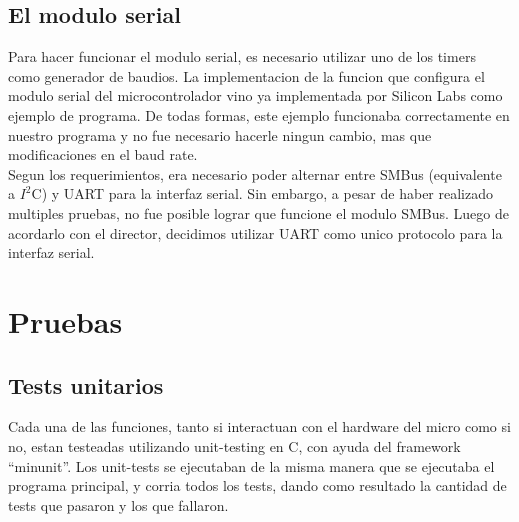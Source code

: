 
\subsection{El modulo serial} %
\label{it2:sub:el_modulo_serial}

Para hacer funcionar el modulo serial, es necesario utilizar uno de los timers como generador de baudios. La implementacion de la funcion que configura el modulo serial del microcontrolador vino ya implementada por Silicon Labs como ejemplo de programa. De todas formas, este ejemplo funcionaba correctamente en nuestro programa y no fue necesario hacerle ningun cambio, mas que modificaciones en el baud rate. \\

Segun los requerimientos, era necesario poder alternar entre SMBus (equivalente a $I^{2}$C) y UART para la interfaz serial. Sin embargo, a pesar de haber realizado multiples pruebas, no fue posible lograr que funcione el modulo SMBus. Luego de acordarlo con el director, decidimos utilizar UART como unico protocolo para la interfaz serial.



\section{Pruebas} %
\label{it2:sec:pruebas}


\subsection{Tests unitarios} %
\label{it2:sub:tests_unitarios}

Cada una de las funciones, tanto si interactuan con el hardware del micro como si no, estan testeadas utilizando unit-testing en C, con ayuda del framework ``minunit''\cite{minunit}. Los unit-tests se ejecutaban de la misma manera que se ejecutaba el programa principal, y corria todos los tests, dando como resultado la cantidad de tests que pasaron y los que fallaron.

